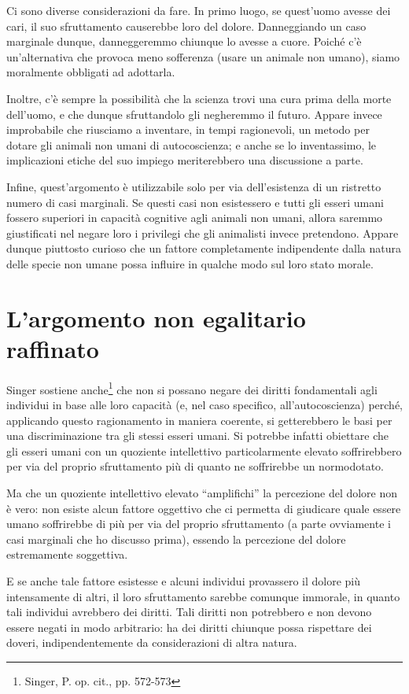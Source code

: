 \documentclass[a4paper,11pt,oneside,article]{memoir}
\begin{document}
Ci sono diverse considerazioni da fare. In primo luogo, se quest'uomo avesse dei
cari, il suo sfruttamento causerebbe loro del dolore. Danneggiando un caso
marginale dunque, danneggeremmo chiunque lo avesse a cuore. Poiché c'è
un'alternativa che provoca meno sofferenza (usare un animale non umano), siamo
moralmente obbligati ad adottarla.

Inoltre, c'è sempre la possibilità che la scienza trovi una cura prima della
morte dell'uomo, e che dunque sfruttandolo gli negheremmo il futuro. Appare
invece improbabile che riusciamo a inventare, in tempi ragionevoli, un metodo
per dotare gli animali non umani di autocoscienza; e anche se lo inventassimo,
le implicazioni etiche del suo impiego meriterebbero una discussione a parte.

Infine, quest'argomento è utilizzabile solo per via dell'esistenza di un
ristretto numero di casi marginali. Se questi casi non esistessero e tutti gli
esseri umani fossero superiori in capacità cognitive agli animali non umani,
allora saremmo giustificati nel negare loro i privilegi che gli animalisti
invece pretendono. Appare dunque piuttosto curioso che un fattore completamente
indipendente dalla natura delle specie non umane possa influire in qualche modo
sul loro stato morale.

\section{L'argomento non egalitario raffinato}

Singer sostiene anche\footnote{Singer, P. op. cit., pp. 572-573} che non si
possano negare dei diritti fondamentali agli individui in base alle loro
capacità (e, nel caso specifico, all'autocoscienza) perché, applicando questo
ragionamento in maniera coerente, si getterebbero le basi per una
discriminazione tra gli stessi esseri umani. Si potrebbe infatti obiettare che
gli esseri umani con un quoziente intellettivo particolarmente elevato
soffrirebbero per via del proprio sfruttamento più di quanto ne soffrirebbe un
normodotato.

Ma che un quoziente intellettivo elevato ``amplifichi'' la percezione del dolore
non è vero: non esiste alcun fattore oggettivo che ci permetta di giudicare
quale essere umano soffrirebbe di più per via del proprio sfruttamento (a parte
ovviamente i casi marginali che ho discusso prima), essendo la percezione del
dolore estremamente soggettiva.

E se anche tale fattore esistesse e alcuni individui provassero il dolore più
intensamente di altri, il loro sfruttamento sarebbe comunque immorale, in quanto
tali individui avrebbero dei diritti. Tali diritti non potrebbero e non devono
essere negati in modo arbitrario: ha dei diritti chiunque possa rispettare dei
doveri, indipendentemente da considerazioni di altra natura.
\end{document}
